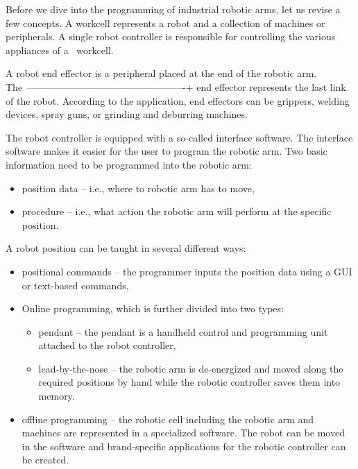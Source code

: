 Before we dive into the programming of industrial robotic arms, let us revise a few concepts.
A workcell represents a robot and a collection of machines or peripherals. A single robot controller is responsible for controlling the various appliances of a~ workcell.

A robot end effector is a peripheral placed at the end of the robotic arm. The~-------------------------------------------------+ end effector represents the last link of the robot. According to the application, end effectors can be grippers, welding devices, spray guns, or grinding and deburring machines.

The robot controller is equipped with a so-called interface software. The interface software makes it easier for the user to program the robotic arm.  
Two basic information need to be programmed into the robotic arm:

\begin{itemize}
    \item position data -- i.e., where to robotic arm has to move,
    \item procedure -- i.e., what action the robotic arm will perform at the specific position.
\end{itemize}

A robot position can be taught in several different ways:

\begin{itemize}
    \item positional commands -- the programmer inputs the position data using a GUI or text-based commands,
    
    \item Online programming, which is further divided into two types:
    
    \begin{itemize}
    
    \item pendant -- the pendant is a handheld control and programming unit attached to the robot controller,
    \item lead-by-the-nose -- the robotic arm is de-energized and moved along the required positions by hand while the robotic controller saves them into memory.
    
    \end{itemize}
    
    \item offline programming -- the robotic cell including the robotic arm and machines are represented in a specialized software. The robot can be moved in the software and brand-specific applications for the robotic controller can be created.
  

\end{itemize}

